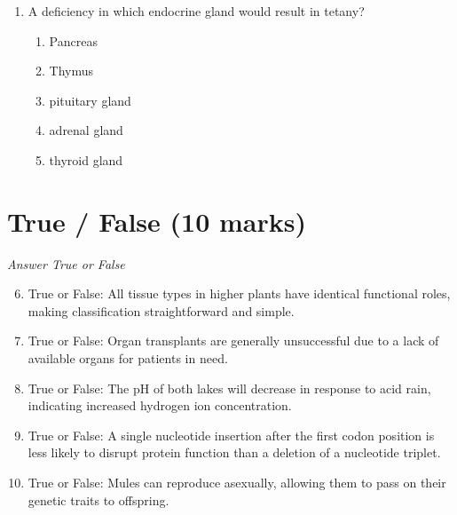 \documentclass[12pt]{article}
\begin{document}
\begin{enumerate}[label=\arabic*.]
\begin{enumerate}[label=(\alph*)]
    \item are more abundant than most other species in their communities
    \item tend to reduce diversity by eliminating food resources for other species
    \item are the largest species in their communities
    \item are the most aggressive species in their communities
    \item are the only species capable of reproduction
\end{enumerate}
\item A deficiency in which endocrine gland would result in tetany?
\begin{enumerate}[label=(\alph*)]
    \item Pancreas
    \item Thymus
    \item pituitary gland
    \item adrenal gland
    \item thyroid gland
\end{enumerate}
\end{enumerate}

\section*{True / False (10 marks)}
\textit{Answer True or False}
\begin{enumerate}[label=\arabic*.]
\setcounter{enumi}{5}
\item True or False: All tissue types in higher plants have identical functional roles, making classification straightforward and simple.
\item True or False: Organ transplants are generally unsuccessful due to a lack of available organs for patients in need.
\item True or False: The pH of both lakes will decrease in response to acid rain, indicating increased hydrogen ion concentration.
\item True or False: A single nucleotide insertion after the first codon position is less likely to disrupt protein function than a deletion of a nucleotide triplet.
\item True or False: Mules can reproduce asexually, allowing them to pass on their genetic traits to offspring.
\end{enumerate}
\end{document}
